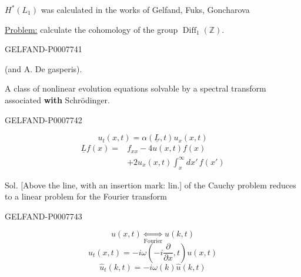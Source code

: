 \(H^*(L_1)\) was calculated in the works of Gelfand, Fuks, Goncharova

\underline{Problem:} calculate the cohomology of the group \(\operatorname{Diff}_1(\mathbb Z)\).


\begin{GelfandAdjacentEvidence}{GELFAND-P000774}{1}

 (and A. De gasperis).

A class of nonlinear evolution equations solvable by a spectral transform associated
\textbf{with} Schrödinger.
\end{GelfandAdjacentEvidence}
\begin{GelfandAdjacentEvidence}{GELFAND-P000774}{2}


\begin{equation}
u_t(x,t)=\alpha(\underline L,t)u_x(x,t)\tag{1}
\end{equation}
\begin{equation}
\begin{split}
\underline L f(x)={}&f_{xx}-4u(x,t)f(x)\\
&+2u_x(x,t)\int_x^\infty dx'\,f(x')
\end{split}\tag{2}
\end{equation}

Sol. [Above the line, with an insertion mark: lin.] of the Cauchy problem reduces to a linear problem for the Fourier transform
\end{GelfandAdjacentEvidence}
\begin{GelfandAdjacentEvidence}{GELFAND-P000774}{3}


\[
u(x,t)\underset{\text{Fourier}}{\Longleftrightarrow}u(k,t)
\]
\[
u_t(x,t)=-i\omega\left(-i\frac{\partial}{\partial x},t\right)u(x,t)
\]
\[
\hat u_t(k,t)=-i\omega(k)\hat u(k,t)
\]
\end{GelfandAdjacentEvidence}
